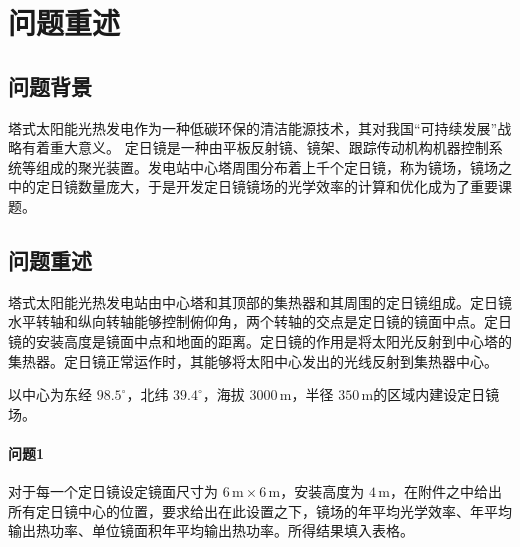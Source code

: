 \section{问题重述}
\subsection{问题背景}
塔式太阳能光热发电作为一种低碳环保的清洁能源技术，其对我国``可持续发展''战略有着重大意义。
定日镜是一种由平板反射镜、镜架、跟踪传动机构机器控制系统等组成的聚光装置。发电站中心塔周围分布着上千个定日镜，称为镜场，镜场之中的定日镜数量庞大，于是开发定日镜镜场的光学效率的计算和优化成为了重要课题。
\subsection{问题重述}
塔式太阳能光热发电站由中心塔和其顶部的集热器和其周围的定日镜组成。定日镜水平转轴和纵向转轴能够控制俯仰角，两个转轴的交点是定日镜的镜面中点。定日镜的安装高度是镜面中点和地面的距离。定日镜的作用是将太阳光反射到中心塔的集热器。定日镜正常运作时，其能够将太阳中心发出的光线反射到集热器中心。

以中心为东经 \(98.5^\circ\)，北纬 \(39.4 ^\circ\)，海拔 \(3000\, \mathrm{m}\)，半径 \(350 \, \mathrm{m}\)的区域内建设定日镜场。
\paragraph{问题1}
对于每一个定日镜设定镜面尺寸为 \(6 \,\mathrm{m} \times 6 \, \mathrm{m}\)，安装高度为 \(4 \,\mathrm{m}\)，在附件之中给出所有定日镜中心的位置，要求给出在此设置之下，镜场的年平均光学效率、年平均输出热功率、单位镜面积年平均输出热功率。所得结果填入表格。

